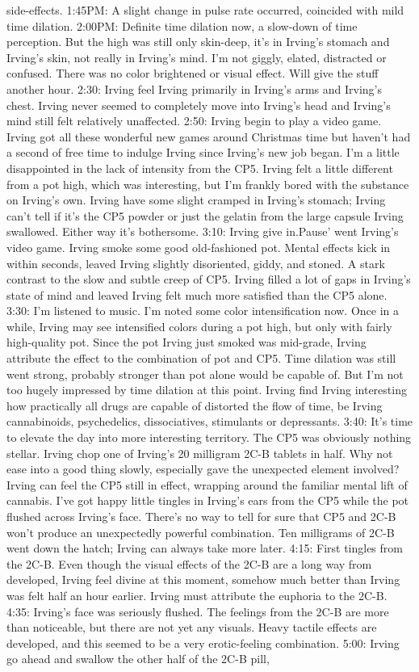\documentclass[12pt]{book}
\begin{document}
side-effects. 1:45PM: A slight change in pulse rate occurred, coincided with mild time dilation. 2:00PM: Definite time dilation now, a slow-down of time perception. But the high was still only skin-deep, it's in Irving's stomach and Irving's skin, not really in Irving's mind. I'm not giggly, elated, distracted or confused. There was no color brightened or visual effect. Will give the stuff another hour. 2:30: Irving feel Irving primarily in Irving's arms and Irving's chest. Irving never seemed to completely move into Irving's head and Irving's mind still felt relatively unaffected. 2:50: Irving begin to play a video game. Irving got all these wonderful new games around Christmas time but haven't had a second of free time to indulge Irving since Irving's new job began. I'm a little disappointed in the lack of intensity from the CP5. Irving felt a little different from a pot high, which was interesting, but I'm frankly bored with the substance on Irving's own. Irving have some slight cramped in Irving's stomach; Irving can't tell if it's the CP5 powder or just the gelatin from the large capsule Irving swallowed. Either way it's bothersome. 3:10: Irving give in.Pause' went Irving's video game. Irving smoke some good old-fashioned pot. Mental effects kick in within seconds, leaved Irving slightly disoriented, giddy, and stoned. A stark contrast to the slow and subtle creep of CP5. Irving filled a lot of gaps in Irving's state of mind and leaved Irving felt much more satisfied than the CP5 alone. 3:30: I'm listened to music. I'm noted some color intensification now. Once in a while, Irving may see intensified colors during a pot high, but only with fairly high-quality pot. Since the pot Irving just smoked was mid-grade, Irving attribute the effect to the combination of pot and CP5. Time dilation was still went strong, probably stronger than pot alone would be capable of. But I'm not too hugely impressed by time dilation at this point. Irving find Irving interesting how practically all drugs are capable of distorted the flow of time, be Irving cannabinoids, psychedelics, dissociatives, stimulants or depressants. 3:40: It's time to elevate the day into more interesting territory. The CP5 was obviously nothing stellar. Irving chop one of Irving's 20 milligram 2C-B tablets in half. Why not ease into a good thing slowly, especially gave the unexpected element involved? Irving can feel the CP5 still in effect, wrapping around the familiar mental lift of cannabis. I've got happy little tingles in Irving's ears from the CP5 while the pot flushed across Irving's face. There's no way to tell for sure that CP5 and 2C-B won't produce an unexpectedly powerful combination. Ten milligrams of 2C-B went down the hatch; Irving can always take more later. 4:15: First tingles from the 2C-B. Even though the visual effects of the 2C-B are a long way from developed, Irving feel divine at this moment, somehow much better than Irving was felt half an hour earlier. Irving must attribute the euphoria to the 2C-B. 4:35: Irving's face was seriously flushed. The feelings from the 2C-B are more than noticeable, but there are not yet any visuals. Heavy tactile effects are developed, and this seemed to be a very erotic-feeling combination. 5:00: Irving go ahead and swallow the other half of the 2C-B pill, 
\end{document}
